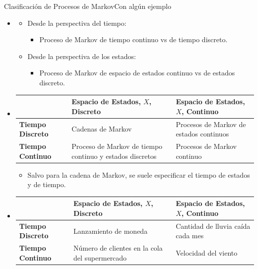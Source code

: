 \documentclass[10pt, envcountsect, handout, aspectratio=1610, hyperref={hypertexnames=true}]{beamer}
\begin{document}
\begin{frame}{Clasificación de Procesos de Markov}{Con algún ejemplo}

\begin{itemize}

\item {}
\begin{itemize}
    \item Desde la perspectiva del tiempo:
    \begin{itemize}
        \item Proceso de Markov de tiempo continuo vs de tiempo discreto.
    \end{itemize}
    \item Desde la perspectiva de los estados:
    \begin{itemize}
        \item Proceso de Markov de espacio de estados continuo vs de estados discreto.
    \end{itemize}
\end{itemize}


\item {}

\hfil
\begin{tabularx}{.85\textwidth}{|l|X|X|}
\hline
                    & \textbf{Espacio de Estados, $X$, Discreto}           & \textbf{Espacio de Estados, $X$, Continuo}            \\ \hline
\textbf{Tiempo Discreto}  & Cadenas de Markov  & Procesos de Markov de estados continuos \\ \hline
\textbf{Tiempo Continuo}  & Proceso de Markov de tiempo continuo y estados discretos & Procesos de Markov continuo \\ \hline
\end{tabularx}

\begin{itemize}
\item
Salvo para la cadena de Markov, se suele especificar el tiempo de estados y de tiempo.
\end{itemize}

\item {}


\hfil
\begin{tabularx}{.85\textwidth}{|l|X|X|}
\hline
                    & \textbf{Espacio de Estados, $X$, Discreto}           & \textbf{Espacio de Estados, $X$, Continuo}            \\ \hline
\textbf{Tiempo Discreto}  & Lanzamiento de moneda                      & Cantidad de lluvia caída cada mes               \\ \hline
\textbf{Tiempo Continuo}  & Número de clientes en la cola del supermercado & Velocidad del viento                          \\ \hline
\end{tabularx}

\end{itemize}
\end{frame}
\end{document}
